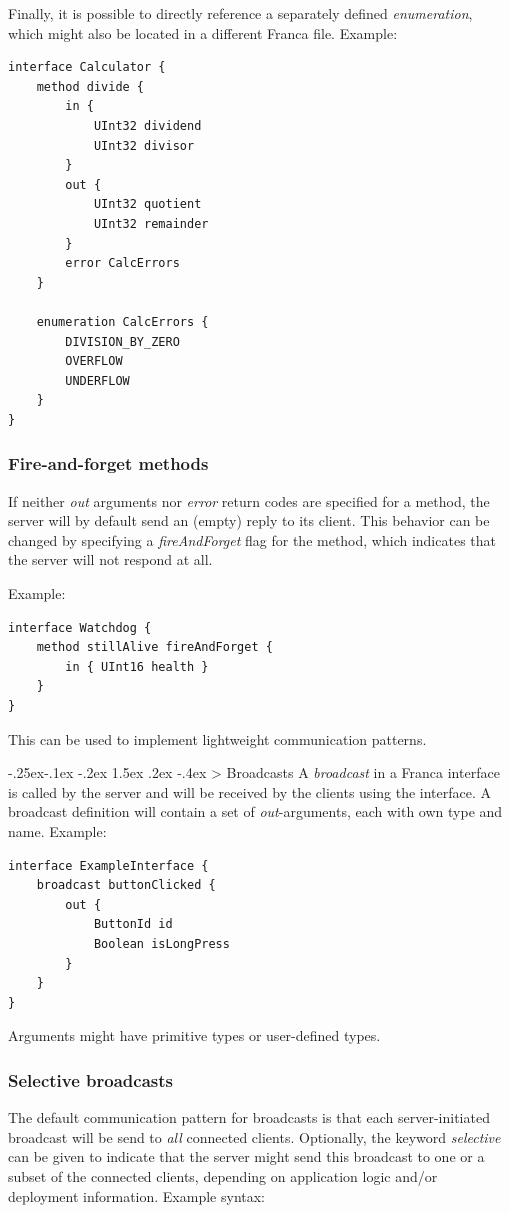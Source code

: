 \documentclass[a4paper,10pt]{scrreprt}
\makeatletter
\renewcommand\subsection{\medskip\@startsection{subsection}{2}{\z@}%
  {-.25ex\@plus -.1ex \@minus -.2ex}%
  {1.5ex \@plus .2ex \@minus -.4ex}%
  {\ifnum \scr@compatibility>\@nameuse{scr@v@2.96}\relax
    \setlength{\parfillskip}{\z@ plus 1fil}\fi
    \raggedsection\normalfont\sectfont\nobreak\size@subsection
  }%
}
\makeatother
\begin{document}
Finally, it is possible to directly reference a separately defined \textit{enumeration},
which might also be located in a different Franca file. Example:


\begin{lstlisting}[language=Franca]
interface Calculator {
	method divide {
		in {
			UInt32 dividend
			UInt32 divisor
		}
		out {
			UInt32 quotient
			UInt32 remainder
		}
		error CalcErrors
	}

	enumeration CalcErrors {
		DIVISION_BY_ZERO
		OVERFLOW
		UNDERFLOW
	}
}
\end{lstlisting}

\subsubsection{Fire-and-forget methods}
\label{FIDL_Interface_Method_FireAndForget}
If neither \textit{out} arguments nor \textit{error} return codes are specified for
a method, the server will by default send an (empty) reply to its client.
This behavior can be changed by specifying a \textit{fireAndForget} flag for
the method, which indicates that the server will not respond at all.

Example:

\begin{lstlisting}[language=Franca]
interface Watchdog {
	method stillAlive fireAndForget {
		in { UInt16 health }
	}
}
\end{lstlisting}

This can be used to implement lightweight communication patterns.

\subsection{Broadcasts}
\label{FIDL_Interface_Broadcast}
A \textit{broadcast} in a Franca interface is called by the server and will be received
by the clients using the interface. A broadcast definition will contain a set of
\textit{out}-arguments, each with own type and name.
Example:


\begin{lstlisting}[language=Franca]
interface ExampleInterface {
	broadcast buttonClicked {
		out {
			ButtonId id
			Boolean isLongPress
		}
	}
}
\end{lstlisting}

Arguments might have primitive types or user-defined types.

\subsubsection{Selective broadcasts}
\label{FIDL_Interface_Broadcast_Selective}
The default communication pattern for broadcasts is that each server-initiated
broadcast will be send to \textit{all} connected clients. Optionally, the keyword
\textit{selective} can be given to indicate that the server might send this broadcast
to one or a subset of the connected clients, depending on application logic
and/or deployment information. Example syntax:
\end{document}
